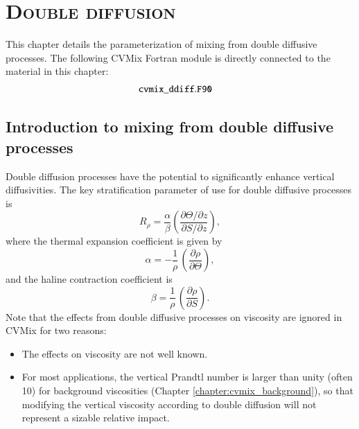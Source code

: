 \chapter{\scshape Double diffusion}
\label{chapter:cvmix_ddiffusion}

\minitoc
\vspace{.5cm}

\begin{mdframed}[backgroundcolor=lightgray!50]
This chapter details the parameterization of mixing from double
diffusive processes.  The following CVMix Fortran module is directly
connected to the material in this chapter:
\begin{align*} 
 &{\tt cvmix\_ddiff.F90}
\end{align*}
\end{mdframed}


\section{Introduction to mixing from double diffusive processes}

Double diffusion processes \citep{Schmitt1994} have the potential to
significantly enhance vertical diffusivities.  The key stratification
parameter of use for double diffusive processes is
\begin{equation}
 R_{\rho} = \frac{\alpha}{\beta} \left( \frac{\partial\Theta/\partial
     z}{\partial S / \partial z} \right),  
\label{eq:stratification-parameter-ddiffuse}
\end{equation}
 where the thermal expansion coefficient is given by 
\begin{equation}
 \alpha = -\frac{1}{\rho} \, \left( \frac{\partial \rho}{\partial  \Theta} \right),
\end{equation}
 and the haline contraction coefficient is 
\begin{equation}
 \beta = \frac{1}{\rho} \, \left( \frac{\partial \rho}{\partial  S} \right).
\end{equation}
Note that the effects from double diffusive processes on viscosity are
ignored in CVMix for two reasons:
\begin{itemize}
 \item The effects on viscosity are not well known.
 \item For most applications, the vertical Prandtl number is larger
   than unity (often 10) for background viscosities (Chapter
   \ref{chapter:cvmix_background}), so that modifying the vertical
   viscosity according to double diffusion will not represent a
   sizable relative impact.
\end{itemize}


